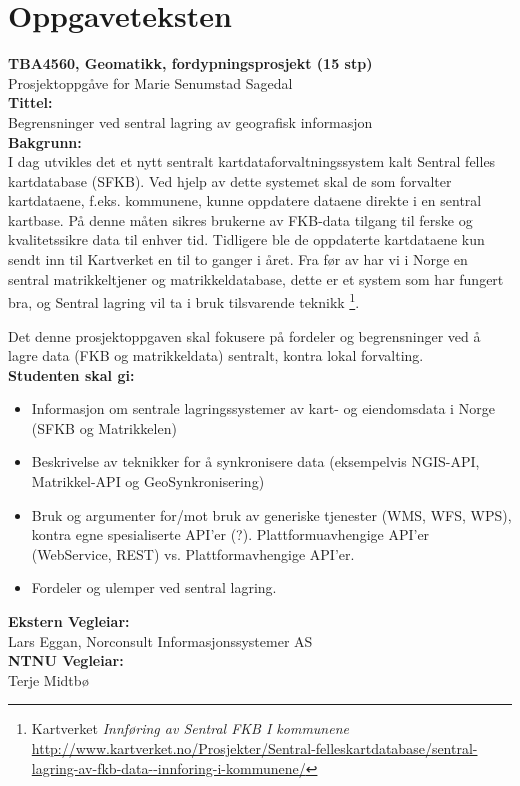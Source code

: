 \chapter{Oppgaveteksten}
\textbf{TBA4560, Geomatikk, fordypningsprosjekt (15 stp)}\\
	Prosjektoppgåve for
	Marie Senumstad Sagedal\\

\noindent\textbf{Tittel:}\\
	Begrensninger ved sentral lagring av geografisk informasjon\\

\noindent\textbf{Bakgrunn:}\\
	I dag utvikles det et nytt sentralt kartdataforvaltningssystem kalt Sentral felles kartdatabase (SFKB). Ved hjelp av dette systemet skal de som forvalter kartdataene, f.eks. kommunene, kunne oppdatere dataene direkte i en sentral kartbase. På denne måten sikres brukerne av FKB-data tilgang til ferske og kvalitetssikre data til enhver tid. Tidligere ble de oppdaterte kartdataene kun sendt inn til Kartverket en til to ganger i året. Fra før av har vi i Norge en sentral matrikkeltjener og matrikkeldatabase, dette er et system som har fungert bra, og Sentral lagring vil ta i bruk tilsvarende teknikk \footnote{ Kartverket \textit{Innføring av Sentral FKB I kommunene} \url{http://www.kartverket.no/Prosjekter/Sentral-felleskartdatabase/sentral-lagring-av-fkb-data--innforing-i-kommunene/}}.

Det denne prosjektoppgaven skal fokusere på fordeler og begrensninger ved å 	lagre data (FKB og matrikkeldata) sentralt, kontra lokal forvalting.\\

\noindent\textbf{Studenten skal gi:}
\begin{itemize}
	\item Informasjon om sentrale lagringssystemer av kart- og eiendomsdata i Norge (SFKB og Matrikkelen)
	\item Beskrivelse av teknikker for å synkronisere data (eksempelvis NGIS-API, Matrikkel-API og GeoSynkronisering)
	\item Bruk og argumenter for/mot bruk av generiske tjenester (WMS, WFS, WPS), kontra egne spesialiserte API'er (?). Plattformuavhengige API'er (WebService, REST) vs. Plattformavhengige API'er.
	\item Fordeler og ulemper ved sentral lagring.\\
\end{itemize}

\noindent\textbf{Ekstern Vegleiar:}\\
	Lars Eggan, Norconsult Informasjonssystemer AS\\

\noindent\textbf{NTNU Vegleiar:}\\
Terje Midtbø